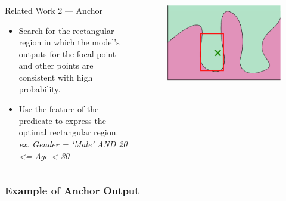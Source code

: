 \documentclass[aspectratio=169]{slide-en}
\begin{document}
\begin{frame}{}
  \begin{columns}[]
    \begin{column}{0.5\textwidth}
      Related Work 2 — Anchor
      \begin{itemize}
        \item Search for the rectangular region in which the model's outputs
              for the focal point and other points are consistent with high
              probability.
        \item Use the feature of the predicate to express the optimal
              rectangular region. \\
              \textit{\footnotesize{ex. Gender = ‘Male’ AND 20 <= Age < 30}}
      \end{itemize}

      \bigskip
    \end{column}
    \begin{column}{0.5\textwidth}
      \begin{figure}
        \includegraphics[scale=0.35]{visual-anchor}
      \end{figure}
    \end{column}
  \end{columns}
\end{frame}

\subsubsection{Example of Anchor Output}
\end{document}
